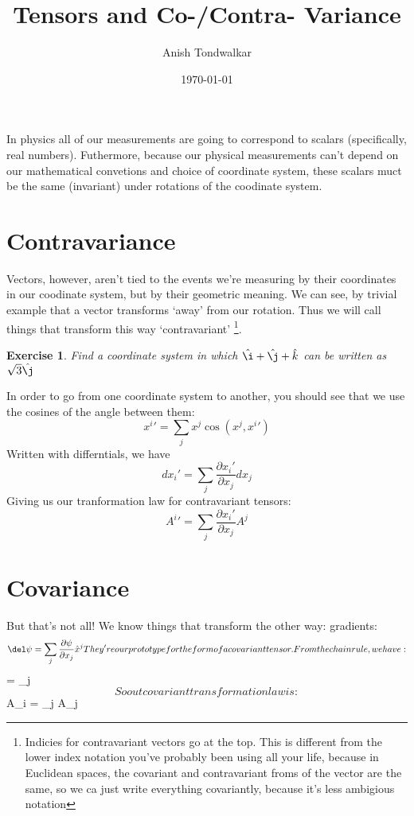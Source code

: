 \documentclass[11pt,notitlepage]{article}
\title{Tensors and Co-/Contra- Variance}
\author{Anish Tondwalkar}
\date{\today}
\newtheorem{exc}{Exercise}[section]
\begin{document}
\maketitle
In physics all of our measurements are going to correspond to scalars (specifically, real numbers). 
Futhermore, because our physical measurements can't depend on our mathematical convetions and choice of coordinate system,
 these scalars muct be the same (invariant) under rotations of the coodinate system.
\section{Contravariance}
 Vectors, however, aren't tied to the events we're measuring by their coordinates in our coodinate system, but by their geometric meaning.
 We can see, by trivial example that a vector transforms `away' from our rotation. 
Thus we will call things that transform this way `contravariant'
\footnote{Indicies for contravariant vectors go at the top. This is different from the lower index notation you've probably been using all your life, because in Euclidean spaces, the covariant and contravariant froms of the vector are the same, so we ca just write everything covariantly, because it's less ambigious notation}. 
\begin{exc}
Find a coordinate system in which
$\hat\i + \hat\j + \hat k$
 can be written as $\sqrt3 \hat\j$
\end{exc}
In order to go from one coordinate system to another, you should see that we use the cosines of the angle between them:
$$ x^i' = \sum_j x^j \cos(x^j,x^i') $$
Written with differntials, we have
$$ dx_i' = \sum_j \frac{\partial x_i'}{\partial x_j} dx_j $$
Giving us our tranformation law for contravariant tensors:
$$ A^i' = \sum_j \frac{\partial x_i'}{\partial x_j} A^j $$
\section{Covariance}
But that's not all! We know things that transform the other way: gradients:
$$ \del \psi = \sum_j \frac{\partial \psi}{\partial x_j} \hat x^j
 They're our prototype for the form of a covariant tensor. 
From the chain rule, we have: 
$$ = \sum_j   $$
So out covariant transformation law is:
$$ A_i = \sum_j  A_j$$
  
\end{document}

